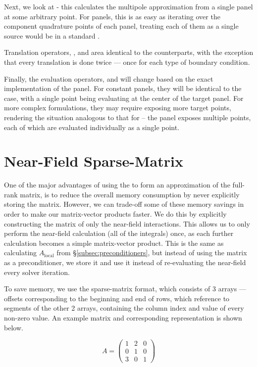 Next, we look at {\ptom} - this calculates the multipole approximation from a single panel at some arbitrary point. For panels, this is as easy as iterating over the component quadrature points of each panel, treating each of them as a single source would be in a standard {\fmm}.

Translation operators, {\mtom}, {\mtol} and {\ltol} area identical to the {\fmm} counterparts, with the exception that every translation is done twice --- once for each type of boundary condition.

Finally, the evaluation operators, {\mtop} and {\ltop} will change based on the exact implementation of the panel. For constant panels, they will be identical to the {\fmm} case, with a single point being evaluating at the center of the target panel. For more complex formulations, they may require exposing more target points, rendering the situation analogous to that for {\ptom} -- the panel exposes multiple points, each of which are evaluated individually as a single point.

\section{Near-Field Sparse-Matrix}\label{sec:fmm_near_field}

One of the major advantages of using the {\fmm} to form an approximation of the full-rank {\bem} matrix, is to reduce the overall memory consumption by never explicitly storing the matrix. However, we can trade-off some of these memory savings in order to make our matrix-vector products faster. We do this by explicitly constructing the matrix of only the near-field interactions. This allows us to only perform the near-field calculation (all of the integrals) once, as each further calculation becomes a simple matrix-vector product. This is the same as calculating $A_{\text{local}}$ from \S\ref{subsec:preconditioners}, but instead of using the matrix as a preconditioner, we store it and use it instead of re-evaluating the near-field every solver iteration.

To save memory, we use the {\csr} sparse-matrix format, which consists of 3 arrays --- offsets corresponding to the beginning and end of rows, which reference to segments of the other 2 arrays, containing the column index and value of every non-zero value. An example matrix and corresponding {\csr} representation is shown below.

\begin{equation}
	A = \left(\begin{array}{ccc}
		1 & 2 & 0 \\
		0 & 1 & 0 \\
		3 & 0 & 1
	\end{array}\right)
\end{equation}

